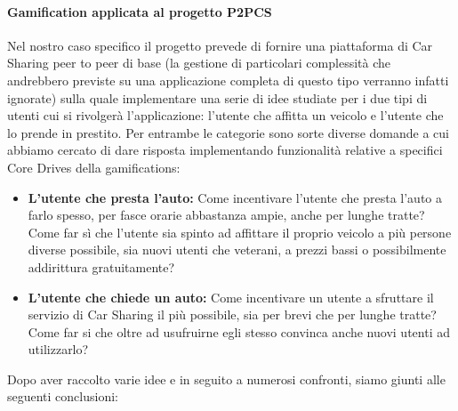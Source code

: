 \paragraph{Gamification applicata al progetto P2PCS}
Nel nostro caso specifico il progetto prevede di fornire una piattaforma di Car Sharing peer to peer di base (la gestione di particolari complessità che andrebbero previste su una applicazione completa di questo tipo verranno infatti ignorate) sulla quale implementare una serie di idee studiate per i due tipi di utenti cui si rivolgerà l'applicazione: l'utente che affitta un veicolo e l'utente che lo prende in prestito. Per entrambe le categorie sono sorte diverse domande a cui abbiamo cercato di dare risposta implementando funzionalità relative a specifici Core Drives della gamifications:
\begin{itemize}
    \item \textbf{L'utente che presta l'auto: }Come incentivare l'utente che presta l'auto a farlo spesso, per fasce orarie abbastanza ampie, anche per lunghe tratte? Come far sì che l'utente sia spinto ad affittare il proprio veicolo a più persone diverse possibile, sia nuovi utenti che veterani, a prezzi bassi o possibilmente addirittura gratuitamente?
    \item \textbf{L'utente che chiede un auto: }Come incentivare un utente a sfruttare il servizio di Car Sharing il più possibile, sia per brevi che per lunghe tratte? Come far si che oltre ad usufruirne egli stesso convinca anche nuovi utenti ad utilizzarlo?
\end{itemize}
Dopo aver raccolto varie idee e in seguito a numerosi confronti, siamo giunti alle seguenti conclusioni:
